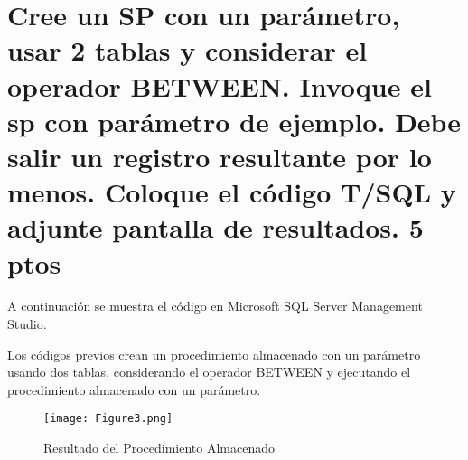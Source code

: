 \documentclass[11pt]{article}
\begin{document}
	\section*{Cree un SP con un parámetro, usar 2 tablas y considerar el operador BETWEEN. Invoque el sp con parámetro de ejemplo. Debe salir un registro resultante por lo menos. Coloque el código T/SQL y adjunte pantalla de resultados. 5 ptos}
	
	A continuación se muestra el código en Microsoft SQL Server Management Studio.
		
	Los códigos previos crean un procedimiento almacenado con un parámetro usando dos tablas, considerando el operador BETWEEN y ejecutando el procedimiento almacenado con un parámetro.
		\begin{figure}[H]
			\centering
			\texttt{[image: Figure3.png]}
			\caption{Resultado del Procedimiento Almacenado}
		\end{figure}
\end{document}
